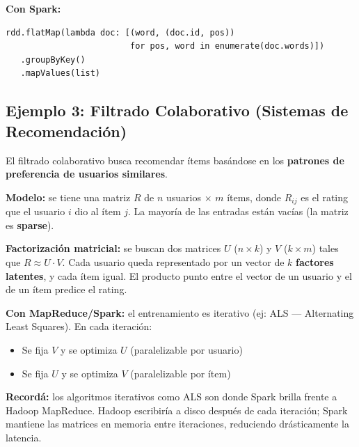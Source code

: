 \documentclass[11pt, a4paper]{article}
\begin{document}
\textbf{Con Spark:}
\begin{verbatim}
rdd.flatMap(lambda doc: [(word, (doc.id, pos))
                         for pos, word in enumerate(doc.words)])
   .groupByKey()
   .mapValues(list)
\end{verbatim}

\subsection{Ejemplo 3: Filtrado Colaborativo (Sistemas de Recomendación)}

El filtrado colaborativo busca recomendar ítems basándose en los \textbf{patrones de preferencia de usuarios similares}.

\textbf{Modelo:} se tiene una matriz $R$ de $n$ usuarios $\times$ $m$ ítems, donde $R_{ij}$ es el rating que el usuario $i$ dio al ítem $j$. La mayoría de las entradas están vacías (la matriz es \textbf{sparse}).

\textbf{Factorización matricial:} se buscan dos matrices $U$ ($n \times k$) y $V$ ($k \times m$) tales que $R \approx U \cdot V$. Cada usuario queda representado por un vector de $k$ \textbf{factores latentes}, y cada ítem igual. El producto punto entre el vector de un usuario y el de un ítem predice el rating.

\textbf{Con MapReduce/Spark:} el entrenamiento es iterativo (ej: ALS --- Alternating Least Squares). En cada iteración:
\begin{itemize}
	\item Se fija $V$ y se optimiza $U$ (paralelizable por usuario)
	\item Se fija $U$ y se optimiza $V$ (paralelizable por ítem)
\end{itemize}

\begin{recallbox}
	\textbf{Recordá:} los algoritmos iterativos como ALS son donde Spark brilla frente a Hadoop MapReduce. Hadoop escribiría a disco después de cada iteración; Spark mantiene las matrices en memoria entre iteraciones, reduciendo drásticamente la latencia.
\end{recallbox}
\end{document}
